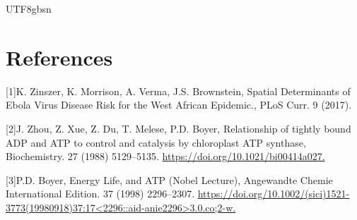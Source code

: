 \documentclass[10pt]{article}
\begin{document}
\begin{CJK}{UTF8}{gbsn}
\FloatBarrier
\section*{References}\sloppy
{}
\label{csl:1}[1]K. Zinszer, K. Morrison, A. Verma, J.S. Brownstein, {Spatial Determinants of Ebola Virus Disease Risk for the West African Epidemic.}, PLoS Curr. 9 (2017).

\label{csl:2}[2]J. Zhou, Z. Xue, Z. Du, T. Melese, P.D. Boyer, {Relationship of tightly bound {ADP} and {ATP} to control and catalysis by chloroplast {ATP} synthase}, Biochemistry. 27 (1988) 5129–5135. \url{https://doi.org/10.1021/bi00414a027.}

\label{csl:3}[3]P.D. Boyer, {Energy Life, and {ATP} (Nobel Lecture)}, Angewandte Chemie International Edition. 37 (1998) 2296–2307. \url{https://doi.org/10.1002/(sici)1521-3773(19980918)37:17<2296::aid-anie2296>3.0.co;2-w.}

\end{CJK}
\end{document}
